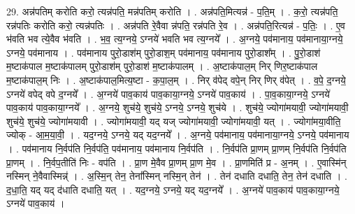 \documentclass[17pt]{extarticle}
\begin{document}
29. अन्न॑पतिम् करोति करो॒ त्यन्न॑पति॒ मन्न॑पतिम् करोति । . अन्न॑पति॒मित्यन्न॑ - प॒ति॒म् । . क॒रो॒ त्यन्न॑पति॒ रन्न॑पतिः करोति करो॒ त्यन्न॑पतिः । . अन्न॑पति रे॒वैवा न्न॑पति॒ रन्न॑पति रे॒व । . अन्न॑पति॒रित्यन्न॑ - प॒तिः॒ । . ए॒व भ॑वति भव त्ये॒वैव भ॑वति । . भ॒व॒ त्य॒ग्नये॒ ऽग्नये॑ भवति भव त्य॒ग्नये᳚ । . अ॒ग्नये॒ पव॑मानाय॒ पव॑मानाया॒ग्नये॒ ऽग्नये॒ पव॑मानाय । . पव॑मानाय पुरो॒डाश॑म् पुरो॒डाश॒म् पव॑मानाय॒ पव॑मानाय पुरो॒डाश᳚म् । . पु॒रो॒डाश॑ म॒ष्टाक॑पाल म॒ष्टाक॑पालम् पुरो॒डाश॑म् पुरो॒डाश॑ म॒ष्टाक॑पालम् । . अ॒ष्टाक॑पाल॒म् निर् णिर॒ष्टाक॑पाल म॒ष्टाक॑पाल॒म् निः । . अ॒ष्टाक॑पाल॒मित्य॒ष्टा - क॒पा॒ल॒म् । . निर् व॑पेद् वपे॒न् निर् णिर् व॑पेत् । . व॒पे॒ द॒ग्नये॒ ऽग्नये॑ वपेद् वपे द॒ग्नये᳚ । . अ॒ग्नये॑ पाव॒काय॑ पाव॒काया॒ग्नये॒ ऽग्नये॑ पाव॒काय॑ । . पा॒व॒काया॒ग्नये॒ ऽग्नये॑ पाव॒काय॑ पाव॒काया॒ग्नये᳚ । . अ॒ग्नये॒ शुच॑ये॒ शुच॑ये॒ ऽग्नये॒ ऽग्नये॒ शुच॑ये । . शुच॑ये॒ ज्योगा॑मयावी॒ ज्योगा॑मयावी॒ शुच॑ये॒ शुच॑ये॒ ज्योगा॑मयावी । . ज्योगा॑मयावी॒ यद् यज् ज्योगा॑मयावी॒ ज्योगा॑मयावी॒ यत् । . ज्योगा॑मया॒वीति॒ ज्योक् - आ॒म॒या॒वी॒ । . यद॒ग्नये॒ ऽग्नये॒ यद् यद॒ग्नये᳚ । . अ॒ग्नये॒ पव॑मानाय॒ पव॑मानाया॒ग्नये॒ ऽग्नये॒ पव॑मानाय । . पव॑मानाय नि॒र्वप॑ति नि॒र्वप॑ति॒ पव॑मानाय॒ पव॑मानाय नि॒र्वप॑ति । . नि॒र्वप॑ति प्रा॒णम् प्रा॒णम् नि॒र्वप॑ति नि॒र्वप॑ति प्रा॒णम् । . नि॒र्वप॒तीति॑ निः - वप॑ति । . प्रा॒ण मे॒वैव प्रा॒णम् प्रा॒ण मे॒व । . प्रा॒णमिति॑ प्र - अ॒नम् । . ए॒वास्मि॑न् नस्मिन् ने॒वैवास्मिन्न्॑ । . अ॒स्मि॒न् तेन॒ तेना᳚स्मिन् नस्मि॒न् तेन॑ । . तेन॑ दधाति दधाति॒ तेन॒ तेन॑ दधाति । . द॒धा॒ति॒ यद् यद् द॑धाति दधाति॒ यत् । . यद॒ग्नये॒ ऽग्नये॒ यद् यद॒ग्नये᳚ । . अ॒ग्नये॑ पाव॒काय॑ पाव॒काया॒ग्नये॒ ऽग्नये॑ पाव॒काय॑ । \newline
\end{document}
